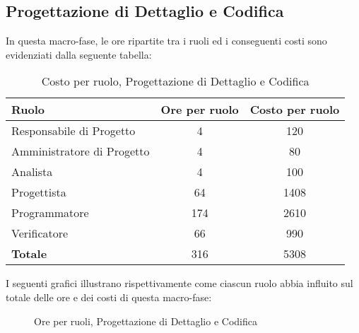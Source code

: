 \subsection{Progettazione di Dettaglio e Codifica}
In questa macro-fase, le ore ripartite tra i ruoli ed i conseguenti costi sono evidenziati dalla seguente tabella:

\begin{table}[h]
\centering
\begin{tabular}{|l|c|c|}
	\toprule
	\textbf{Ruolo} & \textbf{Ore per ruolo} & \textbf{Costo per ruolo} \\
		
	\midrule
	Responsabile di Progetto & 4 & 120 \\
	Amministratore di Progetto & 4 & 80 \\ 
	Analista & 4 & 100 \\
	Progettista & 64 & 1408 \\
	Programmatore & 174 & 2610 \\
	Verificatore & 66 & 990 \\
	\midrule
	\textbf{Totale} & 316 & 5308 \\
	
	\bottomrule
\end{tabular}
\caption{Costo per ruolo, Progettazione di Dettaglio e Codifica}
\end{table}

\newpage
\noindent I seguenti grafici illustrano rispettivamente come ciascun ruolo abbia influito sul totale delle ore e dei costi di questa macro-fase:
\def\cyclelist{{"yellow","magenta","orange","green","blue","red"}}
\begin{figure}[h]
\centering
{}
\caption{Ore per ruoli, Progettazione di Dettaglio e Codifica}
\end{figure}

